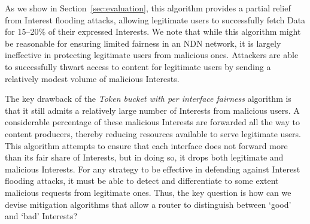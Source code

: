 \documentclass[10pt,conference]{IEEEtran}
\begin{document}
As we show in Section~\ref{sec:evaluation}, this algorithm provides a partial relief from Interest flooding attacks, allowing legitimate users to successfully fetch Data for 15--20\% of their expressed Interests. 
We note that while this algorithm might be reasonable for ensuring limited fairness in an NDN network, it is largely ineffective in protecting legitimate users from malicious ones. 
Attackers are able to successfully thwart access to content for legitimate users by sending a relatively modest volume of malicious Interests.





The key drawback of the {\it Token bucket with per interface fairness} algorithm is that it still admits a relatively large number of Interests from malicious users. A considerable percentage of these malicious Interests are forwarded all the way to content producers, thereby reducing resources available to serve legitimate users.  This algorithm attempts to ensure that each interface does not forward more than its fair share of Interests, but in doing so, it drops both legitimate and malicious Interests. For any strategy to be effective in defending against Interest flooding attacks, it must be able to detect and differentiate to some extent malicious requests from legitimate ones. 
Thus, the key question is how can we devise mitigation algorithms that allow a router to distinguish between `good' and `bad' Interests? 


  
\end{document}

